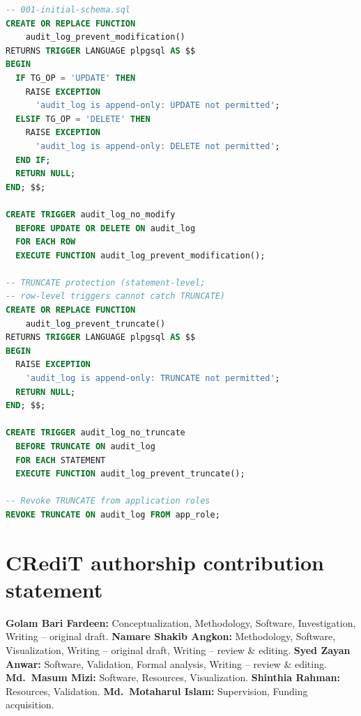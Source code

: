 \documentclass[preprint,12pt]{elsarticle}
\begin{document}
\begin{lstlisting}[language=SQL,
    caption={INSERT-only enforcement on \texttt{audit\_log}.
    Row-level triggers block UPDATE and DELETE; a statement-level
    trigger blocks TRUNCATE (which bypasses row-level triggers in
    PostgreSQL). TRUNCATE privilege is also revoked from application
    roles.},
    label=lst:audittrigger]
-- 001-initial-schema.sql
CREATE OR REPLACE FUNCTION
    audit_log_prevent_modification()
RETURNS TRIGGER LANGUAGE plpgsql AS $$
BEGIN
  IF TG_OP = 'UPDATE' THEN
    RAISE EXCEPTION
      'audit_log is append-only: UPDATE not permitted';
  ELSIF TG_OP = 'DELETE' THEN
    RAISE EXCEPTION
      'audit_log is append-only: DELETE not permitted';
  END IF;
  RETURN NULL;
END; $$;

CREATE TRIGGER audit_log_no_modify
  BEFORE UPDATE OR DELETE ON audit_log
  FOR EACH ROW
  EXECUTE FUNCTION audit_log_prevent_modification();

-- TRUNCATE protection (statement-level;
-- row-level triggers cannot catch TRUNCATE)
CREATE OR REPLACE FUNCTION
    audit_log_prevent_truncate()
RETURNS TRIGGER LANGUAGE plpgsql AS $$
BEGIN
  RAISE EXCEPTION
    'audit_log is append-only: TRUNCATE not permitted';
  RETURN NULL;
END; $$;

CREATE TRIGGER audit_log_no_truncate
  BEFORE TRUNCATE ON audit_log
  FOR EACH STATEMENT
  EXECUTE FUNCTION audit_log_prevent_truncate();

-- Revoke TRUNCATE from application roles
REVOKE TRUNCATE ON audit_log FROM app_role;
\end{lstlisting}


\section*{CRediT authorship contribution statement}
\textbf{Golam Bari Fardeen:} Conceptualization, Methodology, Software,
Investigation, Writing -- original draft.
\textbf{Namare Shakib Angkon:} Methodology, Software, Visualization,
Writing -- original draft, Writing -- review \& editing.
\textbf{Syed Zayan Anwar:} Software, Validation, Formal analysis,
Writing -- review \& editing.
\textbf{Md.\ Masum Mizi:} Software, Resources, Visualization.
\textbf{Shinthia Rahman:} Resources, Validation.
\textbf{Md.\ Motaharul Islam:} Supervision, Funding acquisition.
\end{document}
